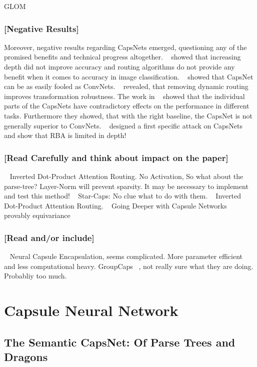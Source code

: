 \documentclass{article}
\begin{document}
GLOM ~\cite{corr/Hinton2021}

\subsubsection*{[Negative Results]}
Moreover, negative results regarding CapsNets emerged, questioning any of the promised benefits and technical progress altogether.
~\cite{acml/PaikKK19} showed that increasing depth did not improve accuracy and routing algorithms do not provide any benefit when it comes to accuracy in image classification.
~\cite{corr/michels2019} showed that CapsNet can be as easily fooled as ConvNets.
~\cite{ieee/Gu2020} revealed, that removing dynamic routing improves transformation robustness.
The work in ~\cite{cvpr/GuT021} showed that the individual parts of the CapsNets have contradictory effects on the performance in different tasks. Furthermore they showed, that with the right baseline, the CapsNet is not generally superior to ConvNets.
~\cite{iclr/Gu2021} designed a first specific attack on CapsNets and
\cite{prl/PeerSR21} show that RBA is limited in depth!


\subsubsection*{[Read Carefully and think about impact on the paper]}
~\cite{iclr/TsaiSGS20} Inverted Dot-Product Attention Routing. No Activation, So what about the parse-tree? Layer-Norm will prevent sparsity. It may be necessary to implement and test this method!
~\cite{nips/AhmedT19} Star-Caps: No clue what to do with them.
~\cite{iclr/TsaiSGS20} Inverted Dot-Product Attention Routing.
 ~\cite{cvpr/RajasegaranJJJS19} Going Deeper with Capsule Networks
~\cite{nips/LenssenFL18} provably equivariance

\subsubsection*{[Read and/or include]}
~\cite{eccv/LiGDOW18} Neural Capsule Encapsulation, seems complicated. More parameter efficient and less computational heavy.
GroupCaps ~\cite{cvpr/ChenJSWS18}, not really sure what they are doing. Probabliy too much.

\section{Capsule Neural Network}
\subsection{The Semantic CapsNet: Of Parse Trees and Dragons}
\end{document}
